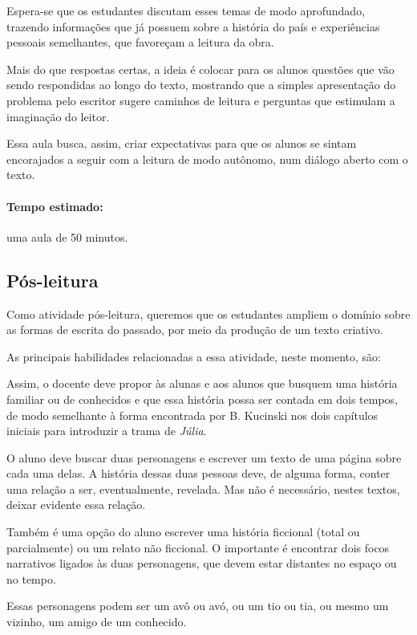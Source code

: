 \documentclass[12pt]{extarticle}
\begin{document}
Espera-se que os estudantes discutam esses temas de modo aprofundado,
trazendo informações que já possuem sobre a história do país e
experiências pessoais semelhantes, que favoreçam a leitura da obra.

Mais do que respostas certas, a ideia é colocar para os alunos questões
que vão sendo respondidas ao longo do texto, mostrando que a simples
apresentação do problema pelo escritor sugere caminhos de leitura e
perguntas que estimulam a imaginação do leitor.

Essa aula busca, assim, criar expectativas para que os alunos se sintam
encorajados a seguir com a leitura de modo autônomo, num diálogo aberto
com o texto.

\paragraph{Tempo estimado:} uma aula de 50 minutos.

\subsection{Pós-leitura}

Como atividade pós-leitura, queremos que os estudantes ampliem o domínio
sobre as formas de escrita do passado, por meio da produção de um texto
criativo.

As principais habilidades relacionadas a essa atividade, neste momento, são:

Assim, o docente deve propor às alunas e aos alunos que busquem uma
história familiar ou de conhecidos e que essa história possa ser contada
em dois tempos, de modo semelhante à forma encontrada por B. Kucinski
nos dois capítulos iniciais para introduzir a trama de \emph{Júlia}.

O aluno deve buscar duas personagens e escrever um texto de uma página
sobre cada uma delas. A história dessas duas pessoas deve, de alguma
forma, conter uma relação a ser, eventualmente, revelada. Mas não é
necessário, nestes textos, deixar evidente essa relação.

Também é uma opção do aluno escrever uma história ficcional (total ou
parcialmente) ou um relato não ficcional. O importante é encontrar dois
focos narrativos ligados às duas personagens, que devem estar distantes
no espaço ou no tempo.

Essas personagens podem ser um avô ou avó, ou um tio ou tia, ou mesmo um
vizinho, um amigo de um conhecido.
\end{document}
